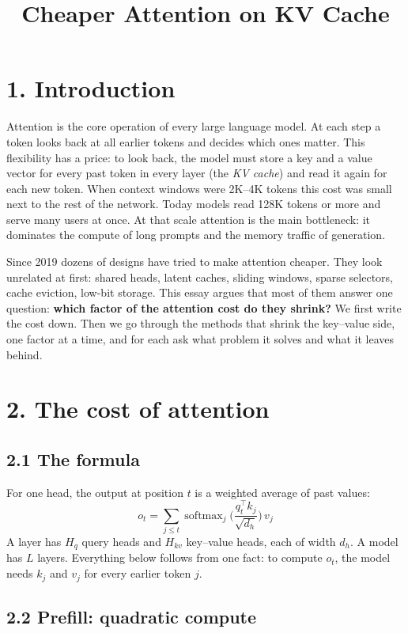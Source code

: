\documentclass[11pt]{article}
\title{Cheaper Attention on KV Cache}
\date{}
\begin{document}
\maketitle

\section{1. Introduction}

Attention is the core operation of every large language model. At each step a token looks back at all earlier tokens and decides which ones matter. This flexibility has a price: to look back, the model must store a key and a value vector for every past token in every layer (the \emph{KV cache}) and read it again for each new token. When context windows were 2K--4K tokens this cost was small next to the rest of the network. Today models read 128K tokens or more and serve many users at once. At that scale attention is the main bottleneck: it dominates the compute of long prompts and the memory traffic of generation.

Since 2019 dozens of designs have tried to make attention cheaper. They look unrelated at first: shared heads, latent caches, sliding windows, sparse selectors, cache eviction, low-bit storage. This essay argues that most of them answer one question: \textbf{which factor of the attention cost do they shrink?} We first write the cost down. Then we go through the methods that shrink the key--value side, one factor at a time, and for each ask what problem it solves and what it leaves behind.

\section{2. The cost of attention}

\subsection{2.1 The formula}

For one head, the output at position \(t\) is a weighted average of past values:
\[
o_t=\sum_{j\le t}\operatorname{softmax}_j\Big(\frac{q_t^{\top}k_j}{\sqrt{d_h}}\Big)\,v_j
\]
A layer has \(H_q\) query heads and \(H_{kv}\) key--value heads, each of width \(d_h\). A model has \(L\) layers. Everything below follows from one fact: to compute \(o_t\), the model needs \(k_j\) and \(v_j\) for every earlier token \(j\).

\subsection{2.2 Prefill: quadratic compute}
\end{document}
